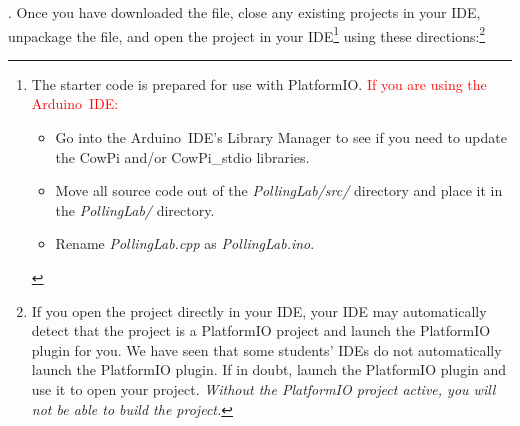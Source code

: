\filesource.
Once you have downloaded the file, close any existing projects in your IDE, unpackage the file, and open the project in your IDE\footnote{
    The starter code is prepared for use with PlatformIO.   %
    \textcolor{red}{If you are using the Arduino~IDE:}
    \begin{itemize}
        \item Go into the Arduino~IDE's Library Manager to see if you need to update the CowPi and/or CowPi\_stdio libraries.
        \item Move all source code out of the \textit{PollingLab/src/} directory and place it in the \textit{PollingLab/} directory.
        \item Rename \textit{PollingLab.cpp} as \textit{PollingLab.ino}.
    \end{itemize}
}
using these directions:\footnote{
    If you open the project directly in your IDE, your IDE may automatically detect that the project is a PlatformIO project and launch the PlatformIO plugin for you.
    We have seen that some students' IDEs do not automatically launch the PlatformIO plugin.
    If in doubt, launch the PlatformIO plugin and use it to open your project.
    \textit{Without the PlatformIO project active, you will not be able to build the project.}
}

\begin{description}
\end{description}


